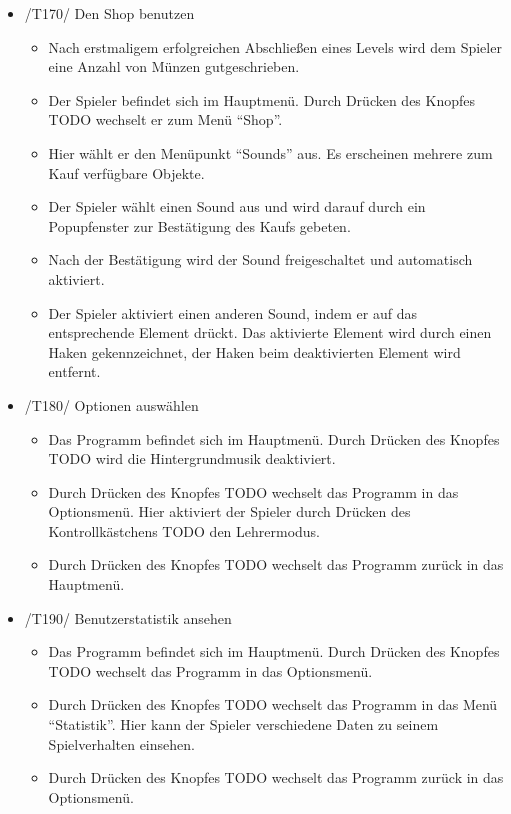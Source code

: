 \begin{itemize}
\item /T170/ Den Shop benutzen
\begin{itemize}
\item Nach erstmaligem erfolgreichen Abschließen eines Levels wird dem Spieler eine Anzahl von Münzen gutgeschrieben.
\item Der Spieler befindet sich im Hauptmenü. Durch Drücken des Knopfes TODO wechselt er zum Menü "`Shop"'.
\item Hier wählt er den Menüpunkt "`Sounds"' aus. Es erscheinen mehrere zum Kauf verfügbare Objekte.
\item Der Spieler wählt einen Sound aus und wird darauf durch ein Popupfenster zur Bestätigung des Kaufs gebeten.
\item Nach der Bestätigung wird der Sound freigeschaltet und automatisch aktiviert.
\item Der Spieler aktiviert einen anderen Sound, indem er auf das entsprechende Element drückt. Das aktivierte Element wird durch einen Haken gekennzeichnet, der Haken beim deaktivierten Element wird entfernt.
\end{itemize}

\item /T180/ Optionen auswählen
\begin{itemize}
\item Das Programm befindet sich im Hauptmenü. Durch Drücken des Knopfes TODO wird die Hintergrundmusik deaktiviert.
\item Durch Drücken des Knopfes TODO wechselt das Programm in das Optionsmenü. Hier aktiviert der Spieler durch Drücken des Kontrollkästchens TODO den Lehrermodus.
\item Durch Drücken des Knopfes TODO wechselt das Programm zurück in das Hauptmenü.
\end{itemize}

\item /T190/ Benutzerstatistik ansehen
\begin{itemize}
\item Das Programm befindet sich im Hauptmenü. Durch Drücken des Knopfes TODO wechselt das Programm in das Optionsmenü.
\item Durch Drücken des Knopfes TODO wechselt das Programm in das Menü "`Statistik"'. Hier kann der Spieler verschiedene Daten zu seinem Spielverhalten einsehen.
\item Durch Drücken des Knopfes TODO wechselt das Programm zurück in das Optionsmenü.
\end{itemize}

\end{itemize}


